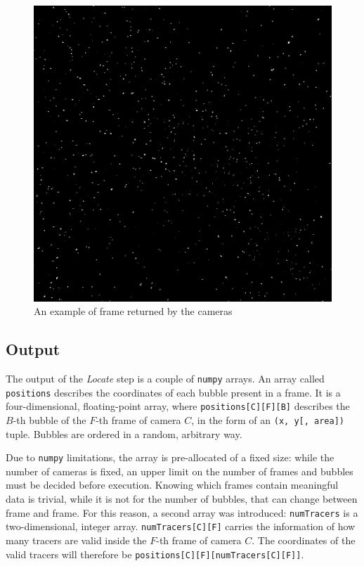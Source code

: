 \begin{figure}
	\centerline{\includegraphics[width=\locateimgsize]{images/locate/_original-frame.png}}
	\caption{\centering An example of frame returned by the cameras}
	\label{fig:locate:original}
\end{figure}

\subsection{Output}

The output of the \textit{Locate} step is a couple of \texttt{numpy} arrays.
An array called \texttt{positions} describes the coordinates of each bubble present in a frame. It is a four-dimensional, floating-point array, where \texttt{positions[C][F][B]} describes the $B$-th bubble of the $F$-th frame of camera $C$, in the form of an \texttt{(x, y[, area])} tuple.
Bubbles are ordered in a random, arbitrary way.

Due to \texttt{numpy} limitations, the array is pre-allocated of a fixed size: while the number of cameras is fixed, an upper limit on the number of frames and bubbles must be decided before execution.
Knowing which frames contain meaningful data is trivial, while it is not for the number of bubbles, that can change between frame and frame.
For this reason, a second array was introduced: \texttt{numTracers} is a two-dimensional, integer array.
\texttt{numTracers[C][F]} carries the information of how many tracers are valid inside the $F$-th frame of camera $C$.
The coordinates of the valid tracers will therefore be \texttt{positions[C][F][numTracers[C][F]]}.

